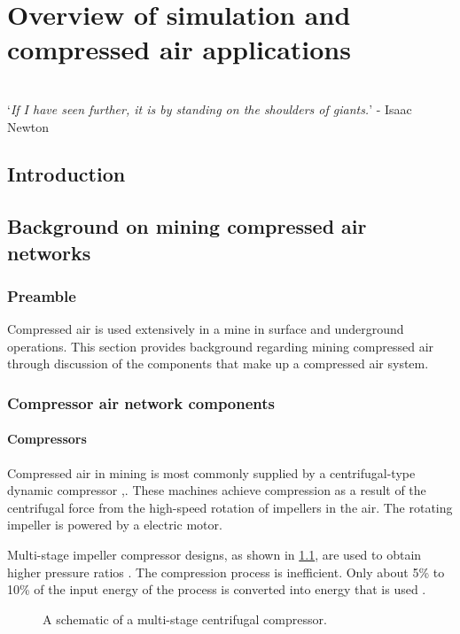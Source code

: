 \chapter{Overview of simulation and compressed air applications}
\label{Chap2}
\thispagestyle{empty}
\vspace{38em}
\hrulefill
\\
\enquote*{\textit{If I have seen further, it is by standing on the shoulders of giants.}} - Isaac Newton\\
\clearpage
\section{Introduction}
\section{Background on mining compressed air networks}
\subsection{Preamble}
Compressed air is used extensively in a mine in surface and underground operations. This section provides background regarding mining compressed air through discussion of the components that make up a compressed air system. 
\subsection{Compressor air network components}
\subsubsection{Compressors}

Compressed air in mining is most commonly supplied by a centrifugal-type dynamic compressor \cite{Fouche2016Masters},\cite{Booysen2012Masters}.  These machines achieve compression as a result of the centrifugal force from the high-speed rotation of impellers in the air. The rotating impeller is  powered by a electric motor.
\par 
 Multi-stage impeller compressor designs, as shown in \cref{fig: Compressor diagram}\footnotemark[1], are used to obtain higher pressure ratios \cite{Fouche2016Masters}. The compression process is inefficient. Only about 5\% to 10\% of the input energy of the process is converted into energy that is used \cite{yang2009air}. 
\begin{figure}[h]
	\centering
	\fbox{\hspace{3cm}\hspace{2.5cm}}
	\caption[A scematic of a multistage centrifugal compressor.]{A schematic of a multi-stage centrifugal compressor\protect \footnotemark[1].}
	\label{fig: Compressor diagram}
\end{figure}


